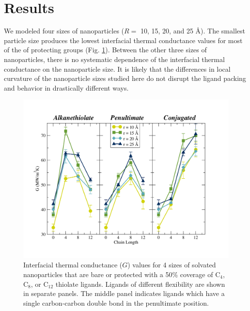 \documentclass[aps,jcp,preprint,showpacs,superscriptaddress,groupedaddress]{revtex4-1}  %
\begin{document}
\section{Results}

We modeled four sizes of nanoparticles ($R =$ 10, 15, 20, and 25
\AA). The smallest particle size produces the lowest interfacial
thermal conductance values for most of the of protecting groups
(Fig. \ref{fig:NPthiols_G}).  Between the other three sizes of
nanoparticles, there is no systematic dependence of the interfacial
thermal conductance on the nanoparticle size. It is likely that the
differences in local curvature of the nanoparticle sizes studied here
do not disrupt the ligand packing and behavior in drastically
different ways.

\begin{figure}
  \includegraphics[width=\linewidth]{figures/G3}
  \caption{Interfacial thermal conductance ($G$) values for 4
      sizes of solvated nanoparticles that are bare or protected with
      a 50\% coverage of C$_{4}$, C$_{8}$, or C$_{12}$ thiolate
      ligands. Ligands of different flexibility are shown in separate
      panels.  The middle panel indicates ligands which have a single
      carbon-carbon double bond in the penultimate position.}
  \label{fig:NPthiols_G}
\end{figure}

\end{document}
